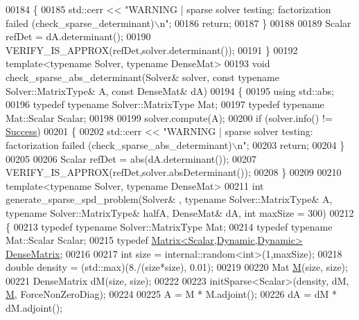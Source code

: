 \begin{DoxyCode}
00184   \{
00185     std::cerr << \textcolor{stringliteral}{"WARNING | sparse solver testing: factorization failed (check\_sparse\_determinant)\(\backslash\)n"};
00186     \textcolor{keywordflow}{return};
00187   \}
00188 
00189   Scalar refDet = dA.determinant();
00190   VERIFY\_IS\_APPROX(refDet,solver.determinant());
00191 \}
00192 \textcolor{keyword}{template}<\textcolor{keyword}{typename} Solver, \textcolor{keyword}{typename} DenseMat>
00193 \textcolor{keywordtype}{void} check\_sparse\_abs\_determinant(Solver& solver, \textcolor{keyword}{const} \textcolor{keyword}{typename} Solver::MatrixType& A, \textcolor{keyword}{const} DenseMat& dA)
00194 \{
00195   \textcolor{keyword}{using} std::abs;
00196   \textcolor{keyword}{typedef} \textcolor{keyword}{typename} Solver::MatrixType Mat;
00197   \textcolor{keyword}{typedef} \textcolor{keyword}{typename} Mat::Scalar Scalar;
00198   
00199   solver.compute(A);
00200   \textcolor{keywordflow}{if} (solver.info() != \hyperlink{group__enums_gga85fad7b87587764e5cf6b513a9e0ee5ea52581b035f4b59c203b8ff999ef5fcea}{Success})
00201   \{
00202     std::cerr << \textcolor{stringliteral}{"WARNING | sparse solver testing: factorization failed (check\_sparse\_abs\_determinant)\(\backslash\)n"};
00203     \textcolor{keywordflow}{return};
00204   \}
00205 
00206   Scalar refDet = abs(dA.determinant());
00207   VERIFY\_IS\_APPROX(refDet,solver.absDeterminant());
00208 \}
00209 
00210 \textcolor{keyword}{template}<\textcolor{keyword}{typename} Solver, \textcolor{keyword}{typename} DenseMat>
00211 \textcolor{keywordtype}{int} generate\_sparse\_spd\_problem(Solver& , \textcolor{keyword}{typename} Solver::MatrixType& A, \textcolor{keyword}{typename} Solver::MatrixType& 
      halfA, DenseMat& dA, \textcolor{keywordtype}{int} maxSize = 300)
00212 \{
00213   \textcolor{keyword}{typedef} \textcolor{keyword}{typename} Solver::MatrixType Mat;
00214   \textcolor{keyword}{typedef} \textcolor{keyword}{typename} Mat::Scalar Scalar;
00215   \textcolor{keyword}{typedef} \hyperlink{group___core___module}{Matrix<Scalar,Dynamic,Dynamic>} 
      \hyperlink{group___core___module}{DenseMatrix};
00216 
00217   \textcolor{keywordtype}{int} size = internal::random<int>(1,maxSize);
00218   \textcolor{keywordtype}{double} density = (std::max)(8./(size*size), 0.01);
00219 
00220   Mat \hyperlink{group___core___module_class_eigen_1_1_matrix}{M}(size, size);
00221   DenseMatrix dM(size, size);
00222 
00223   initSparse<Scalar>(density, dM, \hyperlink{group___core___module_class_eigen_1_1_matrix}{M}, ForceNonZeroDiag);
00224 
00225   A = M * M.adjoint();
00226   dA = dM * dM.adjoint();

\end{DoxyCode}

